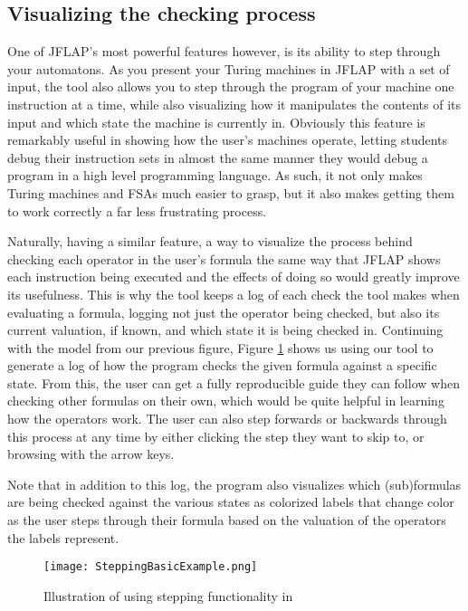 \subsection{Visualizing the checking process}

One of JFLAP's most powerful features however, is its ability to step through your automatons. As you present your Turing machines in JFLAP with a set of input, the tool also allows you to step through the program of your machine one instruction at a time, while also visualizing how it manipulates the contents of its input and which state the machine is currently in. Obviously this feature is remarkably useful in showing how the user's machines operate, letting students debug their instruction sets in almost the same manner they would debug a program in a high level programming language. As such, it not only makes Turing machines and FSAs much easier to grasp, but it also makes getting them to work correctly a far less frustrating process.

Naturally, \cname{} having a similar feature, a way to visualize the process behind checking each operator in the user's formula the same way that JFLAP shows each instruction being executed and the effects of doing so would greatly improve its usefulness. This is why the tool keeps a log of each check the tool makes when evaluating a formula, logging not just the operator being checked, but also its current valuation, if known, and which state it is being checked in. Continuing with the model from our previous figure, Figure \ref{fig:stepperBasic} shows us using our tool to generate a log of how the program checks the given formula against a specific state. From this, the user can get a fully reproducible guide they can follow when checking other formulas on their own, which would be quite helpful in learning how the operators work. The user can also step forwards or backwards through this process at any time by either clicking the step they want to skip to, or browsing with the arrow keys. 

Note that in addition to this log, the program also visualizes which (sub)formulas are being checked against the various states as colorized labels that change color as the user steps through their formula based on the valuation of the operators the labels represent. 

\begin{figure}[H]
	\texttt{[image: SteppingBasicExample.png]}
	\caption{Illustration of using stepping functionality in \cname{}}
	\label{fig:stepperBasic}
\end{figure}


